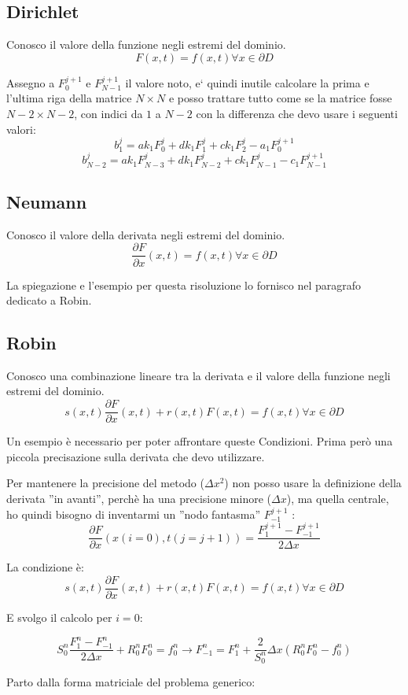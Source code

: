 \documentclass[]{article}
\newcommand{\pde}[2]{\ensuremath{\frac{\partial #1}{\partial #2}}}
\newcommand{\lr}[3]{\ensuremath{\left#1 #3 \right#2}}
\newcommand{\lrt}[1]{\lr{(}{)}{#1}}
\numberwithin{equation}{subsection}
\begin{document}
\subsection{Dirichlet}
Conosco il valore della funzione negli estremi del dominio.
$$F(x,t) = f(x,t) \forall x \in \partial D$$

Assegno a $F_0^{j+1}$ e $F_{N-1}^{j+1}$ il valore noto, e` quindi inutile calcolare la prima e l'ultima riga della matrice $N\times N$ e posso trattare tutto come se la matrice fosse $N-2\times N-2$, con indici da $1$ a $N-2$ con la differenza che devo usare i seguenti valori:
$$b_1^j = ak_1 F_{0}^{j}+ dk_1 F_{1}^{j} + ck_1 F_{2}^{j} - a_1 F_0^{j+1} $$
$$b_{N-2}^j = ak_1 F_{N-3}^{j}+ dk_1 F_{N-2}^{j} + ck_1 F_{N-1}^{j} - c_1 F_{N-1}^{j+1} $$
\subsection{Neumann}
Conosco il valore della derivata negli estremi del dominio.
$$\pde Fx(x,t) = f(x,t) \forall x \in \partial D$$

La spiegazione e l'esempio per questa risoluzione lo fornisco nel paragrafo dedicato a Robin.

\subsection{Robin}
Conosco una combinazione lineare tra la derivata e il valore della funzione negli estremi del dominio.
$$s(x,t)\pde Fx(x,t) +r(x,t) F(x,t) = f(x,t) \forall x \in \partial D$$

Un esempio \`e necessario per poter affrontare queste Condizioni. Prima per\`o una piccola precisazione sulla derivata che devo utilizzare.

Per mantenere la precisione del metodo ($\Delta x^2$) non posso usare la definizione della derivata ''in avanti'', perch\`e ha una precisione minore ($\Delta x$), ma quella centrale,  ho quindi bisogno di inventarmi un ''nodo fantasma'' $F_{-1}^{j+1}$ :
$$\pde Fx(x(i=0),t(j=j+1)) = \frac{F_{1}^{j+1}-F_{-1}^{j+1}}{2\Delta x}$$

La condizione \`e:
$$s(x,t)\pde Fx(x,t) +r(x,t) F(x,t) = f(x,t) \forall x \in \partial D$$

E svolgo il calcolo per $i=0$:

$$S_0^n\frac{F_{1}^{n}-F_{-1}^{n}}{2\Delta x} + R_0^nF_{0}^{n} = f_0^n  \to 
F_{-1}^{n} = F_{1}^{n} + \frac 2{S_0^n}\Delta x \lrt{R_0^nF_{0}^{n}-f^n_0}$$

Parto dalla forma matriciale del problema generico:
\end{document}
